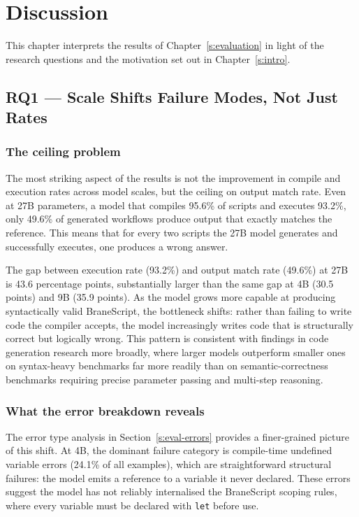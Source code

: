 \chapter{Discussion}\label{s:discussion}

This chapter interprets the results of Chapter~\ref{s:evaluation} in light of
the research questions and the motivation set out in Chapter~\ref{s:intro}.

\section{RQ1 --- Scale Shifts Failure Modes, Not Just Rates}

\subsection{The ceiling problem}

The most striking aspect of the  results is not the improvement in compile
and execution rates across model scales, but the ceiling on output match rate.
Even at 27B parameters, a model that compiles 95.6\% of scripts and
executes 93.2\%, only 49.6\% of generated workflows produce output that
exactly matches the reference. This means that for every two scripts the 27B model
generates and successfully executes, one produces a wrong answer.

The gap between execution rate (93.2\%) and output match rate (49.6\%) at 27B
is 43.6 percentage points, substantially larger than the same gap at 4B
(30.5 points) and 9B (35.9 points). As the model grows more capable at
producing syntactically valid BraneScript, the bottleneck shifts: rather than
failing to write code the compiler accepts, the model increasingly writes code
that is structurally correct but logically wrong. This pattern is consistent
with findings in code generation research more broadly, where larger models
outperform smaller ones on syntax-heavy benchmarks far more readily than on
semantic-correctness benchmarks requiring precise parameter passing and
multi-step reasoning.

\subsection{What the error breakdown reveals}

The error type analysis in Section~\ref{s:eval-errors} provides a finer-grained
picture of this shift. At 4B, the dominant failure category is compile-time
undefined variable errors (24.1\% of all examples), which are straightforward
structural failures: the model emits a reference to a variable it never
declared. These errors suggest the model has not reliably internalised the
BraneScript scoping rules, where every variable must be declared with
\texttt{let} before use.

